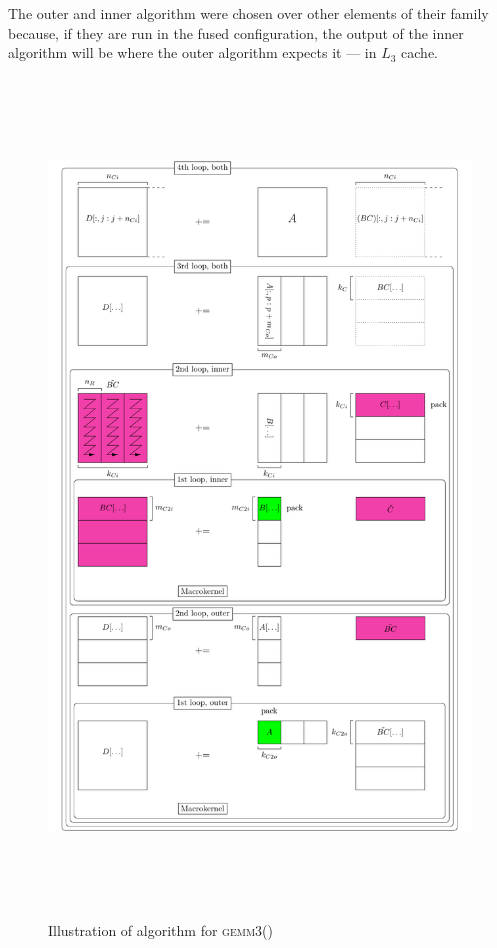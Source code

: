 \documentclass[12pt]{article}
\newcommand*{\gemmt}{{\textsc{gemm3()}}}
\begin{document}
The outer and inner algorithm were chosen over other elements of their family because, if they are run in the fused configuration, the output of the inner algorithm will be where the outer algorithm expects it --- in $L_3$ cache.

\begin{figure}
  \centering
  \includegraphics[height=8.75in]{gemm3-picture}
  \caption{Illustration of algorithm for \gemmt{}}
  \label{fig:gemm3}
\end{figure}
\end{document}
